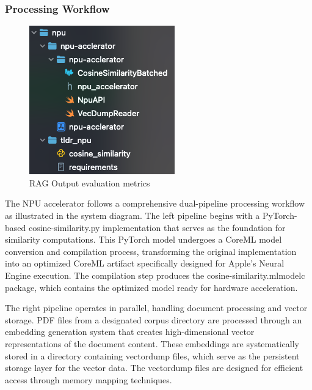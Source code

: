 \subsubsection{Processing Workflow}
\begin{figure}[H]
    \centering
    \includegraphics[width=0.8\linewidth]{images/npu-fs.png}
    \caption{RAG Output evaluation metrics ~\cite{cardenas2023rag}}
    \label{fig:autoregressive_decoding}
\end{figure}

The NPU accelerator follows a comprehensive dual-pipeline processing workflow as illustrated in the system diagram. The left pipeline begins with a PyTorch-based cosine-similarity.py implementation that serves as the foundation for similarity computations. This PyTorch model undergoes a CoreML model conversion and compilation process, transforming the original implementation into an optimized CoreML artifact specifically designed for Apple's Neural Engine execution. The compilation step produces the cosine-similarity.mlmodelc package, which contains the optimized model ready for hardware acceleration.

The right pipeline operates in parallel, handling document processing and vector storage. PDF files from a designated corpus directory are processed through an embedding generation system that creates high-dimensional vector representations of the document content. These embeddings are systematically stored in a directory containing vectordump files, which serve as the persistent storage layer for the vector data. The vectordump files are designed for efficient access through memory mapping techniques.

